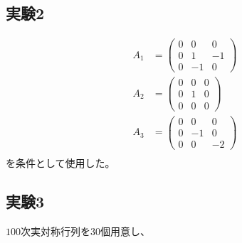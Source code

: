\subsection{実験2}
\begin{align*}
  A_1 & = \left(
            \begin{array}{ccc}
              0 &  0 &  0 \\
              0 &  1 & -1 \\
              0 & -1 &  0
            \end{array}
          \right) \\
  A_2 & = \left(
            \begin{array}{ccc}
              0 & 0 & 0 \\
              0 & 1 & 0 \\
              0 & 0 & 0
            \end{array}
          \right) \\
  A_3 & = \left(
            \begin{array}{ccc}
              0 &  0 &  0 \\
              0 & -1 &  0 \\
              0 &  0 & -2
            \end{array}
          \right) \\
\end{align*}
を条件として使用した。

\subsection{実験3}
$100$次実対称行列を30個用意し、
